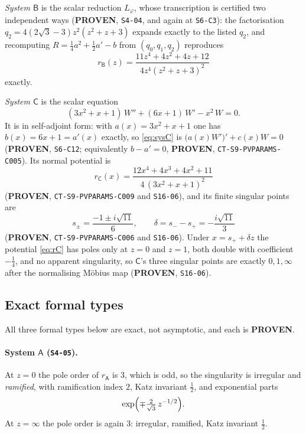 \emph{System $\mathsf B$} is the scalar reduction $L_\varphi$, whose
transcription is certified two independent ways (\textbf{PROVEN},
\texttt{S4-04}, and again at \texttt{S6-C3}): the factorisation
$q_2=4(2\sqrt3-3)z^2(z^2+z+3)$ expands exactly to the listed $q_2$, and
recomputing $R=\tfrac14a^2+\tfrac12a'-b$ from $(q_0,q_1,q_2)$ reproduces
\begin{equation}\label{eq:rB}
  r_{\mathsf B}(z)=\frac{11z^4+4z^2+4z+12}{4z^4(z^2+z+3)^2}
\end{equation}
exactly.

\emph{System $\mathsf C$} is the scalar equation
\begin{equation}\label{eq:sysC}
  (3x^2+x+1)\,W''+(6x+1)\,W'-x^2\,W=0 .
\end{equation}
It is in self-adjoint form: with $a(x)=3x^2+x+1$ one has $b(x)=6x+1=a'(x)$
exactly, so \eqref{eq:sysC} is $\bigl(a(x)W'\bigr)'+c(x)W=0$
(\textbf{PROVEN}, \texttt{S6-C12}; equivalently $b-a'=0$, \textbf{PROVEN},
\texttt{CT-S9-PVPARAMS-C005}). Its normal potential is
\begin{equation}\label{eq:rC}
  r_{\mathsf C}(x)=\frac{12x^4+4x^3+4x^2+11}{4\,(3x^2+x+1)^2}
\end{equation}
(\textbf{PROVEN}, \texttt{CT-S9-PVPARAMS-C009} and \texttt{S16-06}), and its
finite singular points are
\begin{equation}\label{eq:spm}
  s_\pm=\frac{-1\pm i\sqrt{11}}{6},
  \qquad \delta=s_--s_+=-\frac{i\sqrt{11}}{3}
\end{equation}
(\textbf{PROVEN}, \texttt{CT-S9-PVPARAMS-C006} and \texttt{S16-06}). Under
$x=s_++\delta z$ the potential \eqref{eq:rC} has poles only at $z=0$ and $z=1$,
both double with coefficient $-\tfrac14$, and no apparent singularity, so
$\mathsf C$'s three singular points are exactly $0,1,\infty$ after the
normalising M\"obius map (\textbf{PROVEN}, \texttt{S16-06}).

\subsection{Exact formal types}\label{ssec:formaltypes}

All three formal types below are exact, not asymptotic, and each is
\textbf{PROVEN}.

\paragraph{System $\mathsf A$ (\texttt{S4-05}).} At $z=0$ the pole order of
$r_{\mathsf A}$ is $3$, which is odd, so the singularity is irregular and
\emph{ramified}, with ramification index $2$, Katz invariant $\tfrac12$, and
exponential parts
\[
  \exp\Bigl(\mp\tfrac{2}{\sqrt3}\,z^{-1/2}\Bigr).
\]
At $z=\infty$ the pole order is again $3$: irregular, ramified, Katz invariant
$\tfrac12$.

